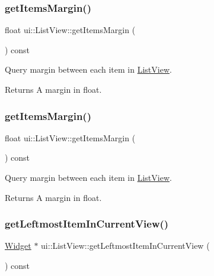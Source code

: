 \subsubsection{\texorpdfstring{get\+Items\+Margin()}{getItemsMargin()}\hspace{0.1cm}{\footnotesize\ttfamily [1/2]}}
{\footnotesize\ttfamily float ui\+::\+List\+View\+::get\+Items\+Margin (\begin{DoxyParamCaption}{ }\end{DoxyParamCaption}) const}



Query margin between each item in \hyperlink{classui_1_1ListView}{List\+View}. 

\begin{DoxyReturn}{Returns}
A margin in float. 
\end{DoxyReturn}
\mbox{\label{classui_1_1ListView_a1b035dc59aabb5c9addcef3e16917900}} 
\subsubsection{\texorpdfstring{get\+Items\+Margin()}{getItemsMargin()}\hspace{0.1cm}{\footnotesize\ttfamily [2/2]}}
{\footnotesize\ttfamily float ui\+::\+List\+View\+::get\+Items\+Margin (\begin{DoxyParamCaption}{ }\end{DoxyParamCaption}) const}



Query margin between each item in \hyperlink{classui_1_1ListView}{List\+View}. 

\begin{DoxyReturn}{Returns}
A margin in float. 
\end{DoxyReturn}
\mbox{\label{classui_1_1ListView_a734534e1c90d258a63dfa3199c2603a4}} 
\subsubsection{\texorpdfstring{get\+Leftmost\+Item\+In\+Current\+View()}{getLeftmostItemInCurrentView()}\hspace{0.1cm}{\footnotesize\ttfamily [1/2]}}
{\footnotesize\ttfamily \hyperlink{classui_1_1Widget}{Widget} $\ast$ ui\+::\+List\+View\+::get\+Leftmost\+Item\+In\+Current\+View (\begin{DoxyParamCaption}{ }\end{DoxyParamCaption}) const}




